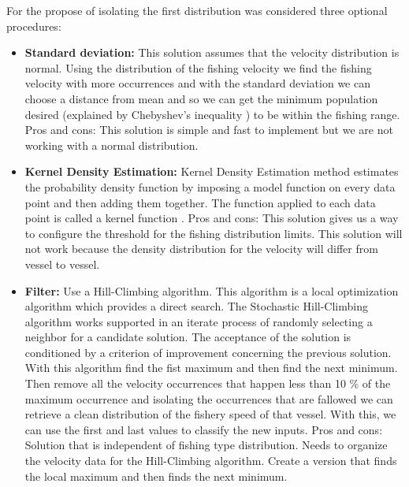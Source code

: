 For the propose of isolating the first distribution was considered three optional procedures:
\begin{itemize}
\item    \textbf{Standard deviation:}
This solution assumes that the velocity distribution is normal.   Using the distribution of the fishing velocity we find the fishing velocity with more occurrences and with the standard deviation we can choose a distance from mean and so we can get the minimum population desired (explained by Chebyshev’s inequality \cite{Chebyshevinequality}) to be within the fishing range. \\
Pros and cons: This solution is simple and fast to implement but we are not working with a normal distribution.

\item    \textbf{Kernel Density Estimation:}
Kernel Density Estimation method estimates the probability density function by imposing a model function on every data point and then adding them together. The function applied to each data point is called a kernel function \cite{KernelDensityEstimation}.
Pros and cons: This solution gives us a way to configure the threshold for the fishing distribution limits. This solution will not work because the density distribution for the velocity will differ from vessel to vessel. 

\item    \textbf{Filter:}
Use a Hill-Climbing algorithm\cite{Kvasnicka1995HillCW}. This algorithm is a local optimization algorithm which provides a direct search. The Stochastic Hill-Climbing algorithm works supported in an iterate process of randomly selecting a neighbor for a candidate solution. The acceptance of the solution is conditioned by a criterion of improvement concerning the previous solution. With this algorithm find the fist maximum and then find the next minimum.
Then remove all the velocity occurrences that happen less than 10 \% of the maximum occurrence and isolating the occurrences that are fallowed we can retrieve a clean distribution of the fishery speed of that vessel.  With this, we can use the first and last values to classify the new inputs. 
Pros and cons: Solution that is independent of fishing type distribution. Needs to organize the velocity data for the Hill-Climbing algorithm. Create a version that finds the local maximum and then finds the next minimum.
\end{itemize}

